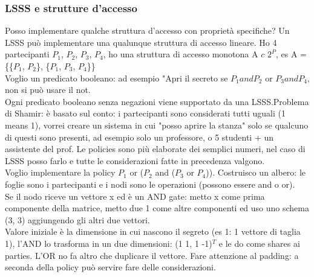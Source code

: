 \documentclass[16px]{article}
\begin{document}
\subsubsection{LSSS e strutture d'accesso}
Posso implementare qualche struttura d'accesso con proprietà specifiche? Un LSSS può implementare una qualunque struttura di accesso lineare. Ho 4 partecipanti $P_1$, $P_2$, $P_3$, $P_4$, ho una struttura di accesso monotona A $c$ $2^P$, es A = \{\{$P_1$, $P_2$\}, \{$P_1$, $P_3$, $P_4$\}\}\\ Voglio un predicato booleano: ad esempio "Apri il secreto se $P_1 and P_2$ or $P_3 and P_4$, non si può usare il not.\\ Ogni predicato booleano senza negazioni viene supportato da una LSSS.Problema di Shamir: è basato sul conto: i partecipanti sono considerati tutti uguali (1 means 1), vorrei creare un sistema in cui "posso aprire la stanza" solo se qualcuno di questi sono presenti, ad esempio solo un professore, o 5 studenti + un assistente del prof. Le policies sono più elaborate dei semplici numeri, nel caso di LSSS posso farlo e tutte le considerazioni fatte in precedenza valgono.\\ Voglio implementare la policy $P_1$ or ($P_2$ and ($P_3$ or $P_4$)). Costruisco un albero: le foglie sono i partecipanti e i nodi sono le operazioni (possono essere and o or).\\ Se il nodo riceve un vettore x ed è un AND gate: metto x come prima componente della matrice, metto due 1 come altre componenti ed uso uno schema (3, 3) aggiungendo gli altri due vettori.\\ Valore iniziale è la dimensione in cui nascono il segreto (es 1: 1 vettore di taglia 1), l'AND lo trasforma in un due dimensioni: (1 1, 1 -1)$^T$ e le do come shares ai parties. L'OR no fa altro che duplicare il vettore. Fare attenzione al padding: a seconda della policy può servire fare delle considerazioni.
\end{document}
